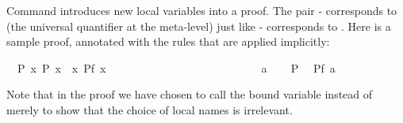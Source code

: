 \begin{isabellebody}
\begin{isamarkuptext}
Command  introduces new local variables into a
proof. The pair - corresponds to 
(the universal quantifier at the
meta-level) just like - corresponds to
. Here is a sample proof, annotated with the rules that are
applied implicitly:%
\end{isamarkuptext}%
\isamarkuptrue%
\isamarkupfalse%
\ \ P{}\ {}{}x{}\ P\ x{}\ \ {}{}x{}\ P{}f\ x{}{}\isanewline
%
\isadelimproof
%
\endisadelimproof
%
\isatagproof
{}\isamarkupfalse%
\ \ \ \ \ \ \ \ \ \ \ \ \ \ \ \ \ \ \ \ \ \ \ %
\isanewline
\ \ \isamarkupfalse%
\ a\isanewline
\ \ \isamarkupfalse%
\ P\ \isamarkupfalse%
\ {}P{}f\ a{}{}\ \isamarkupfalse%
\ \ %
\isanewline
{}\isamarkupfalse%
%
\endisatagproof
{\isafoldproof}%
%
\isadelimproof
%
\endisadelimproof
%
\begin{isamarkuptext}%
\noindent Note that in the proof we have chosen to call the bound
variable  instead of  merely to show that the choice of
local names is irrelevant.


\end{isamarkuptext}
\end{isabellebody}
